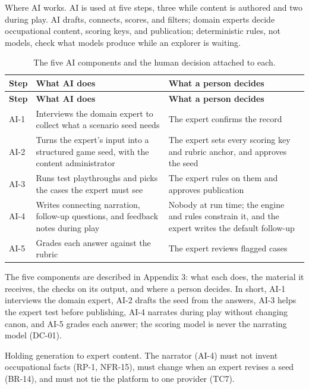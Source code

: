 Where AI works. AI is used at five steps, three while content is authored and two during play. AI drafts, connects, scores, and filters; domain experts decide occupational content, scoring keys, and publication; deterministic rules, not models, check what models produce while an explorer is waiting.

{\small{}\renewcommand{\arraystretch}{1.1}
\begin{longtable}{|>{\raggedright\arraybackslash}p{}|>{\raggedright\arraybackslash}p{}|>{\raggedright\arraybackslash}p{}|}
\caption{The five AI components and the human decision attached to each.} \\
\hline
\textbf{Step} & \textbf{What AI does} & \textbf{What a person decides} \\ \hline
\endfirsthead
\hline
\textbf{Step} & \textbf{What AI does} & \textbf{What a person decides} \\ \hline
\endhead
AI-1 & Interviews the domain expert to collect what a scenario seed needs & The expert confirms the record \\ \hline
AI-2 & Turns the expert's input into a structured game seed, with the content administrator & The expert sets every scoring key and rubric anchor, and approves the seed \\ \hline
AI-3 & Runs test playthroughs and picks the cases the expert must see & The expert rules on them and approves publication \\ \hline
AI-4 & Writes connecting narration, follow-up questions, and feedback notes during play & Nobody at run time; the engine and rules constrain it, and the expert writes the default follow-up \\ \hline
AI-5 & Grades each answer against the rubric & The expert reviews flagged cases \\ \hline
\end{longtable}
}

The five components are described in Appendix 3: what each does, the material it receives, the checks on its output, and where a person decides. In short, AI-1 interviews the domain expert, AI-2 drafts the seed from the answers, AI-3 helps the expert test before publishing, AI-4 narrates during play without changing canon, and AI-5 grades each answer; the scoring model is never the narrating model (DC-01).

Holding generation to expert content. The narrator (AI-4) must not invent occupational facts (RP-1, NFR-15), must change when an expert revises a seed (BR-14), and must not tie the platform to one provider (TC7).

